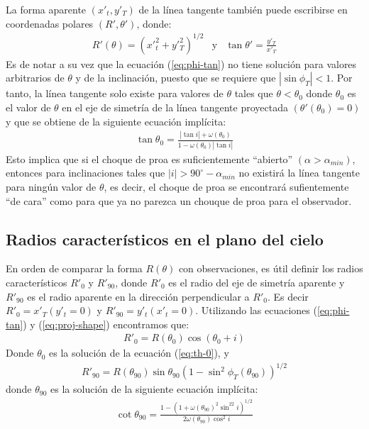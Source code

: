 La forma aparente $(x'_t, y'_T)$  de la línea tangente también puede escribirse
en coordenadas polares $(R', \theta')$, donde:
\begin{align}
  R'(\theta) = \left(x'_t^2 + y'_T^2\right)^{1/2} & \mathrm{y} & \tan\theta' = \frac{y'_T}{x'_T}
  \label{eq:polar}
\end{align}
Es de notar a su vez que la ecuación (\ref{eq:phi-tan}) no tiene solución para valores
arbitrarios de $\theta$ y de la inclinación, puesto que se requiere que
$\left|\sin\phi_T\right| < 1$. Por tanto, la línea tangente solo existe para valores
de $\theta$ tales que $\theta < \theta_0$ donde $\theta_0$ es el valor de $\theta$ en
el eje de simetría de la línea tangente proyectada $(\theta'(\theta_0) = 0)$ y que se
obtiene de la siguiente ecuación implícita:
\begin{align}
  \tan\theta_0 = \frac{|\tan i| + \omega(\theta_0)}{1 - \omega(\theta_0)|\tan i|}
  \label{eq:th-0}
\end{align}
Esto implica que si el choque de proa es suficientemente ``abierto''
$(\alpha > \alpha_{min})$, entonces para inclinaciones tales que
$|i| > 90^\circ - \alpha_{min}$ no existirá la línea tangente para ningún valor de $\theta$,
es decir, el choque de proa se encontrará sufientemente ``de cara'' como para que ya no
parezca un chouque de proa para el observador.

\subsection{Radios característicos en el plano del cielo}

En orden de comparar la forma $R(\theta)$ con observaciones, es útil definir los radios
característicos $R'_0$ y $R'_{90}$, donde $R'_0$ es el radio del eje de simetría aparente
y $R'_{90}$ es el radio aparente en la dirección perpendicular a $R'_0$. Es decir
$R'_0 = x'_T(y'_t=0)$ y $R'_{90} = y'_t(x'_t = 0)$. Utilizando las ecuaciones
(\ref{eq:phi-tan}) y (\ref{eq:proj-shape}) encontramos que:
\begin{align}
R'_0 = R(\theta_0)\cos(\theta_0 + i)
\label{eq:R0p}
\end{align}
Donde $\theta_0$ es la solución de la ecuación (\ref{eq:th-0}), y
\begin{align}
  R'_{90} = R(\theta_{90})\sin\theta_{90}\left(1-\sin^2\phi_T(\theta_{90})\right)^{1/2}
  \label{eq:R90p}
\end{align}
donde $\theta_{90}$ es la solución de la siguiente ecuación implícita:
\begin{align}
  \cot\theta_{90} = \frac{1 - \left(1+\omega(\theta_{90})^2\sin^22i\right)^{1/2}}
  {2\omega(\theta_{90})\cos^2i}
  \label{eq:th90}
\end{align}

